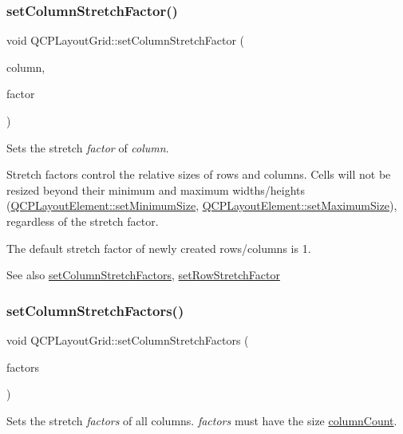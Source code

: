 \subsubsection{\texorpdfstring{set\+Column\+Stretch\+Factor()}{setColumnStretchFactor()}}
{\footnotesize\ttfamily void Q\+C\+P\+Layout\+Grid\+::set\+Column\+Stretch\+Factor (\begin{DoxyParamCaption}\item[{int}]{column,  }\item[{double}]{factor }\end{DoxyParamCaption})}

Sets the stretch {\itshape factor} of {\itshape column}.

Stretch factors control the relative sizes of rows and columns. Cells will not be resized beyond their minimum and maximum widths/heights (\hyperlink{class_q_c_p_layout_element_a5dd29a3c8bc88440c97c06b67be7886b}{Q\+C\+P\+Layout\+Element\+::set\+Minimum\+Size}, \hyperlink{class_q_c_p_layout_element_a74eb5280a737ab44833d506db65efd95}{Q\+C\+P\+Layout\+Element\+::set\+Maximum\+Size}), regardless of the stretch factor.

The default stretch factor of newly created rows/columns is 1.

\begin{DoxySeeAlso}{See also}
\hyperlink{class_q_c_p_layout_grid_a6c2591d1a7e2534ce036989543b49e57}{set\+Column\+Stretch\+Factors}, \hyperlink{class_q_c_p_layout_grid_a7b0273de5369bd93d942edbaf5b166ec}{set\+Row\+Stretch\+Factor} 
\end{DoxySeeAlso}
\hypertarget{class_q_c_p_layout_grid_a6c2591d1a7e2534ce036989543b49e57}{}\label{class_q_c_p_layout_grid_a6c2591d1a7e2534ce036989543b49e57} 
\subsubsection{\texorpdfstring{set\+Column\+Stretch\+Factors()}{setColumnStretchFactors()}}
{\footnotesize\ttfamily void Q\+C\+P\+Layout\+Grid\+::set\+Column\+Stretch\+Factors (\begin{DoxyParamCaption}\item[{const Q\+List$<$ double $>$ \&}]{factors }\end{DoxyParamCaption})}

Sets the stretch {\itshape factors} of all columns. {\itshape factors} must have the size \hyperlink{class_q_c_p_layout_grid_a1a2962cbf45011405b64b913afa8e7a2}{column\+Count}.

